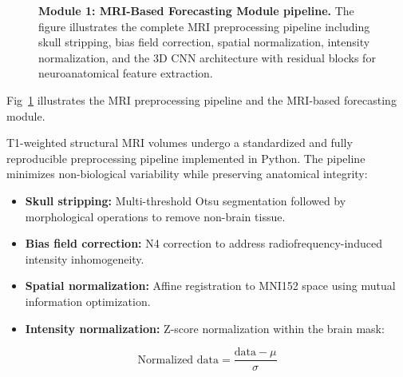 \documentclass[10pt,letterpaper]{article}
\begin{document}
                                            \begin{figure}[!ht]
                                            \caption{\textbf{Module 1: MRI-Based Forecasting Module pipeline.}
                                            The figure illustrates the complete MRI preprocessing pipeline including skull stripping, bias field correction, spatial normalization, intensity normalization, and the 3D CNN architecture with residual blocks for neuroanatomical feature extraction.}
                                            \label{fig:module1}
                                            \end{figure}

                                            Fig~\ref{fig:module1} illustrates the MRI preprocessing pipeline and the MRI-based forecasting module.

                                            T1-weighted structural MRI volumes undergo a standardized and fully reproducible preprocessing pipeline implemented in Python. The pipeline minimizes non-biological variability while preserving anatomical integrity:
                                            \begin{itemize}
                                                \item \textbf{Skull stripping:} Multi-threshold Otsu segmentation followed by morphological operations to remove non-brain tissue.
                                                    \item \textbf{Bias field correction:} N4 correction to address radiofrequency-induced intensity inhomogeneity.
                                                        \item \textbf{Spatial normalization:} Affine registration to MNI152 space using mutual information optimization.
                                                            \item \textbf{Intensity normalization:} Z-score normalization within the brain mask:
                                                            \end{itemize}

                                                            \begin{equation}
                                                            \label{eq:z_score_mri}
                                                            \text{Normalized data} = \frac{\text{data} - \mu}{\sigma}
                                                            \end{equation}
\end{document}
